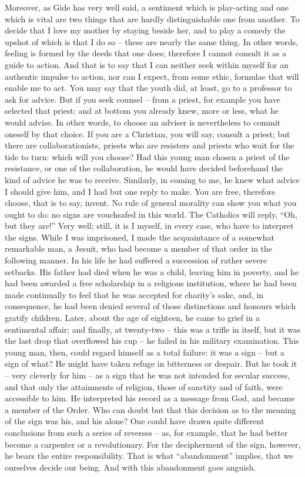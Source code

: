 \documentclass[12pt]{article}
\begin{document}
Moreover, as Gide has very well said, a sentiment which is play-acting and one which is vital are two things that are hardly distinguishable one from another. To decide that I love my mother by staying beside her, and to play a comedy the upshot of which is that I do so – these are nearly the same thing. In other words, feeling is formed by the deeds that one does; therefore I cannot consult it as a guide to action. And that is to say that I can neither seek within myself for an authentic impulse to action, nor can I expect, from some ethic, formulae that will enable me to act. You may say that the youth did, at least, go to a professor to ask for advice. But if you seek counsel – from a priest, for example you have selected that priest; and at bottom you already knew, more or less, what he would advise. In other words, to choose an adviser is nevertheless to commit oneself by that choice. If you are a Christian, you will say, consult a priest; but there are collaborationists, priests who are resisters and priests who wait for the tide to turn: which will you choose? Had this young man chosen a priest of the resistance, or one of the collaboration, he would have decided beforehand the kind of advice he was to receive. Similarly, in coming to me, he knew what advice I should give him, and I had but one reply to make. You are free, therefore choose, that is to say, invent. No rule of general morality can show you what you ought to do: no signs are vouchsafed in this world. The Catholics will reply, “Oh, but they are!” Very well; still, it is I myself, in every case, who have to interpret the signs. While I was imprisoned, I made the acquaintance of a somewhat remarkable man, a Jesuit, who had become a member of that order in the following manner. In his life he had suffered a succession of rather severe setbacks. His father had died when he was a child, leaving him in poverty, and he had been awarded a free scholarship in a religious institution, where he had been made continually to feel that he was accepted for charity’s sake, and, in consequence, he had been denied several of those distinctions and honours which gratify children. Later, about the age of eighteen, he came to grief in a sentimental affair; and finally, at twenty-two – this was a trifle in itself, but it was the last drop that overflowed his cup – he failed in his military examination. This young man, then, could regard himself as a total failure: it was a sign – but a sign of what? He might have taken refuge in bitterness or despair. But he took it – very cleverly for him – as a sign that he was not intended for secular success, and that only the attainments of religion, those of sanctity and of faith, were accessible to him. He interpreted his record as a message from God, and became a member of the Order. Who can doubt but that this decision as to the meaning of the sign was his, and his alone? One could have drawn quite different conclusions from such a series of reverses – as, for example, that he had better become a carpenter or a revolutionary. For the decipherment of the sign, however, he bears the entire responsibility. That is what “abandonment” implies, that we ourselves decide our being. And with this abandonment goes anguish.
\end{document}
